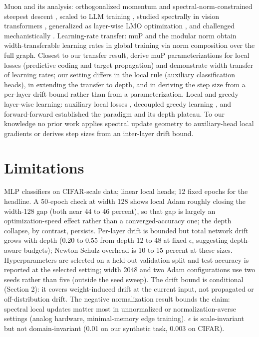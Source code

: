 \documentclass[11pt]{article}
\newcommand{\eps}{\epsilon}
\begin{document}
Muon and its analysis: orthogonalized momentum and spectral-norm-constrained steepest descent \citep{jordan2024muon,bernstein2024old}, scaled to LLM training \citep{liu2025muon}, studied spectrally in vision transformers \citep{southworth2026muon}, generalized as layer-wise LMO optimization \citep{riabinin2025gluon}, and challenged mechanistically \citep{shumaylov2026muon}. Learning-rate transfer: muP \citep{yang2022tensor} and the modular norm \citep{large2024modular} obtain width-transferable learning rates in global training via norm composition over the full graph. Closest to our transfer result, \citet{ishikawa2024local} derive muP parameterizations for local losses (predictive coding and target propagation) and demonstrate width transfer of learning rates; our setting differs in the local rule (auxiliary classification heads), in extending the transfer to depth, and in deriving the step size from a per-layer drift bound rather than from a parameterization. Local and greedy layer-wise learning: auxiliary local losses \citep{nokland2019local}, decoupled greedy learning \citep{belilovsky2019decoupled}, and forward-forward \citep{hinton2022forward} established the paradigm and its depth plateau. To our knowledge no prior work applies spectral update geometry to auxiliary-head local gradients or derives step sizes from an inter-layer drift bound.

\section{Limitations}

MLP classifiers on CIFAR-scale data; linear local heads; 12 fixed epochs for the headline. A 50-epoch check at width 128 shows local Adam roughly closing the width-128 gap (both near 44 to 46 percent), so that gap is largely an optimization-speed effect rather than a converged-accuracy one; the depth collapse, by contrast, persists. Per-layer drift is bounded but total network drift grows with depth (0.20 to 0.55 from depth 12 to 48 at fixed $\eps$, suggesting depth-aware budgets); Newton-Schulz overhead is 10 to 15 percent at these sizes. Hyperparameters are selected on a held-out validation split and test accuracy is reported at the selected setting; width 2048 and two Adam configurations use two seeds rather than five (outside the seed sweep). The drift bound is conditional (Section 2): it covers weight-induced drift at the current input, not propagated or off-distribution drift. The negative normalization result bounds the claim: spectral local updates matter most in unnormalized or normalization-averse settings (analog hardware, minimal-memory edge training). $\eps$ is scale-invariant but not domain-invariant (0.01 on our synthetic task, 0.003 on CIFAR).
\end{document}

